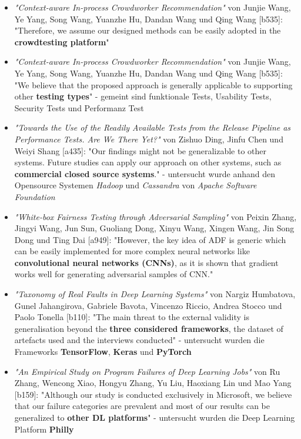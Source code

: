 \begin{itemize}
    \item  \textit{"Context-aware In-process Crowdworker Recommendation"} von Junjie Wang, Ye Yang, Song Wang, Yuanzhe Hu, Dandan Wang und Qing Wang [b535]: "Therefore, we assume our designed methods can be easily adopted in the \textbf{crowdtesting platform}"
    \item  \textit{"Context-aware In-process Crowdworker Recommendation"} von Junjie Wang, Ye Yang, Song Wang, Yuanzhe Hu, Dandan Wang und Qing Wang [b535]: "We believe that the proposed approach is generally applicable to supporting other \textbf{testing types}" - gemeint sind funktionale Tests, Usability Tests, Security Tests und Performanz Test
    \item \textit{"Towards the Use of the Readily Available Tests from the Release Pipeline as Performance Tests. Are We There Yet?"} von Zishuo Ding, Jinfu Chen und Weiyi Shang [a435]: "Our findings might not be generalizable to other systems. Future studies can apply our approach on other systems, such as \textbf{commercial closed source systems}." - untersucht wurde anhand den Opensource Systemen \textit{Hadoop} und \textit{Cassandra} von \textit{Apache Software Foundation}
    \item \textit{"White-box Fairness Testing through Adversarial Sampling"} von Peixin Zhang, Jingyi Wang, Jun Sun, Guoliang Dong, Xinyu Wang, Xingen Wang, Jin Song Dong und Ting Dai [a949]: "However, the key idea of ADF is generic which can be easily implemented for more complex neural networks like \textbf{convolutional neural networks (CNNs)}, as it is shown that gradient works well for generating adversarial samples of CNN."
    \item \textit{"Taxonomy of Real Faults in Deep Learning Systems"} von Nargiz Humbatova, Gunel Jahangirova, Gabriele Bavota, Vincenzo Riccio, Andrea Stocco und Paolo Tonella [b110]: "The main threat to the external validity is generalisation beyond the \textbf{three considered frameworks}, the dataset of artefacts used and the interviews conducted" - untersucht wurden die Frameworks \textbf{TensorFlow}, \textbf{Keras} und \textbf{PyTorch}
    \item \textit{"An Empirical Study on Program Failures of Deep Learning Jobs"} von Ru Zhang, Wencong Xiao, Hongyu Zhang, Yu Liu, Haoxiang Lin und Mao Yang [b159]: "Although our study is conducted exclusively in Microsoft, we believe that our failure categories are prevalent and most of our results can be generalized to \textbf{other DL platforms}" - untersucht wurden die Deep Learning Platform \textbf{Philly}

\end{itemize}
